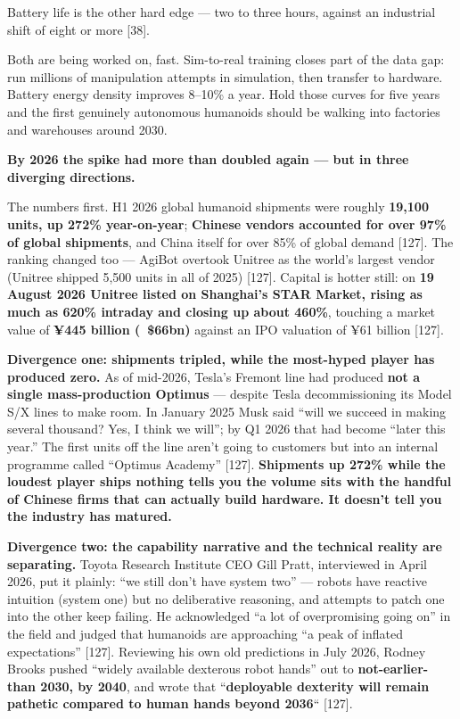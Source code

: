 \documentclass[11pt,a4paper]{article}
\begin{document}
Battery life is the other hard edge --- two to three hours, against an industrial shift of eight or more [38].

Both are being worked on, fast. Sim-to-real training closes part of the data gap: run millions of manipulation attempts in simulation, then transfer to hardware. Battery energy density improves 8--10\% a year. Hold those curves for five years and the first genuinely autonomous humanoids should be walking into factories and warehouses around 2030.

\textbf{By 2026 the spike had more than doubled again --- but in three diverging directions.}

The numbers first. H1 2026 global humanoid shipments were roughly \textbf{19,100 units, up 272\% year-on-year}; \textbf{Chinese vendors accounted for over 97\% of global shipments}, and China itself for over 85\% of global demand [127]. The ranking changed too --- AgiBot overtook Unitree as the world's largest vendor (Unitree shipped 5,500 units in all of 2025) [127]. Capital is hotter still: on \textbf{19 August 2026 Unitree listed on Shanghai's STAR Market, rising as much as 620\% intraday and closing up about 460\%}, touching a market value of \textbf{¥445 billion (~\$66bn)} against an IPO valuation of ¥61 billion [127].

\textbf{Divergence one: shipments tripled, while the most-hyped player has produced zero.} As of mid-2026, Tesla's Fremont line had produced \textbf{not a single mass-production Optimus} --- despite Tesla decommissioning its Model S/X lines to make room. In January 2025 Musk said ``will we succeed in making several thousand? Yes, I think we will''; by Q1 2026 that had become ``later this year.'' The first units off the line aren't going to customers but into an internal programme called ``Optimus Academy'' [127]. \textbf{Shipments up 272\% while the loudest player ships nothing tells you the volume sits with the handful of Chinese firms that can actually build hardware. It doesn't tell you the industry has matured.}

\textbf{Divergence two: the capability narrative and the technical reality are separating.} Toyota Research Institute CEO Gill Pratt, interviewed in April 2026, put it plainly: ``we still don't have system two'' --- robots have reactive intuition (system one) but no deliberative reasoning, and attempts to patch one into the other keep failing. He acknowledged ``a lot of overpromising going on'' in the field and judged that humanoids are approaching ``a peak of inflated expectations'' [127]. Reviewing his own old predictions in July 2026, Rodney Brooks pushed ``widely available dexterous robot hands'' out to \textbf{not-earlier-than 2030, by 2040}, and wrote that ``\textbf{deployable dexterity will remain pathetic compared to human hands beyond 2036}`` [127].
\end{document}
